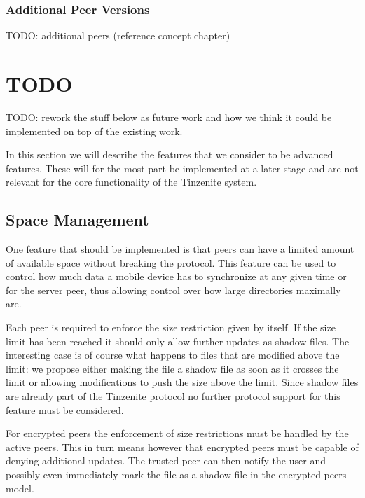 \subsubsection{Additional Peer Versions}
\label{subs:Additional Peer Versions}

TODO: additional peers (reference concept chapter)

\section{TODO}
\label{sec:TODO}

TODO: rework the stuff below as future work and how we think it could be implemented on top of the existing work.

In this section we will describe the features that we consider to be advanced features.
These will for the most part be implemented at a later stage and are not relevant for the core functionality of the Tinzenite system.

\subsection{Space Management}
\label{sub:Space Management}

One feature that should be implemented is that peers can have a limited amount of available space without breaking the protocol.
This feature can be used to control how much data a mobile device has to synchronize at any given time or for the server peer, thus allowing control over how large directories maximally are.

Each peer is required to enforce the size restriction given by itself.
If the size limit has been reached it should only allow further updates as shadow files.
The interesting case is of course what happens to files that are modified above the limit: we propose either making the file a shadow file as soon as it crosses the limit or allowing modifications to push the size above the limit.
Since shadow files are already part of the Tinzenite protocol no further protocol support for this feature must be considered.

For encrypted peers the enforcement of size restrictions must be handled by the active peers.
This in turn means however that encrypted peers must be capable of denying additional updates.
The trusted peer can then notify the user and possibly even immediately mark the file as a shadow file in the encrypted peers model.

